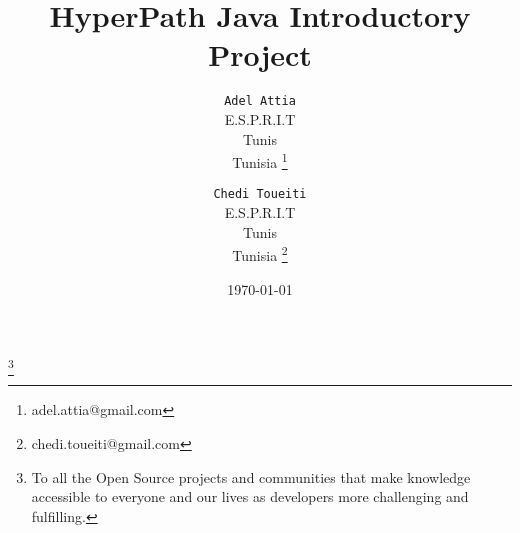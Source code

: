 \title{HyperPath Java Introductory Project}
\author{
  \texttt{Adel Attia}\\
  E.S.P.R.I.T\\
  Tunis\\
  Tunisia  
  \thanks {adel.attia@gmail.com}
  \and
 \texttt{Chedi Toueiti}\\
  E.S.P.R.I.T \\
  Tunis\\
  Tunisia  
  \thanks {chedi.toueiti@gmail.com}
}
\date{\today}
\maketitle
\thanks{To all the Open Source projects and communities that make knowledge accessible to everyone and our lives as developers more challenging and fulfilling.}
